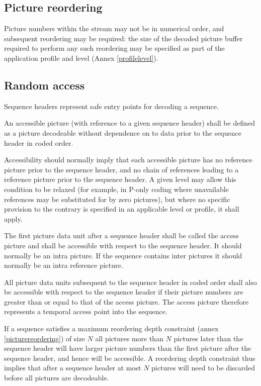 \subsection{Picture reordering}
Picture numbers within the stream may not be in numerical order, and 
subsequent reordering may be required: the size  
of the decoded picture buffer required to perform any such reordering may be 
specified as part of the application profile and level (Annex \ref{profilelevel}).
 
\subsection{Random access}
\label{randomaccess}
Sequence headers represent safe entry points for decoding a sequence. 

An accessible picture (with reference to a given sequence header)
shall be defined as a picture decodeable without dependence on 
to data prior to the sequence header in coded order.

Accessibility should normally imply that each accessible picture has
no reference picture prior to the sequence header, and no chain of 
references leading to a reference picture prior to the sequence header. 
A given level may allow this condition to
be relaxed (for example, in P-only coding where unavailable references
may be substituted for by zero pictures), but where no specific provision
to the contrary is specified in an applicable level or profile, it shall 
apply.

The first picture data unit after a sequence header shall be called the 
access picture and shall be accessible with respect to the sequence header.
It should normally be an intra picture. If the sequence contains inter pictures
it should normally be an intra reference picture.

All picture data units subsequent to the sequence header in coded order 
shall also be accessible with respect to the sequence header
if their picture numbers are greater than 
or equal to that of the access picture. The access picture therefore represents 
a temporal access point into the sequence.

\begin{informative}

If a sequence satisfies a maximum reordering depth constraint 
(annex \ref{picturereordering})
of size $N$ all pictures more than $N$ pictures later than the sequence header will
have larger picture numbers than the first picture after the sequence header, and hence will be accessible. A reordering depth constraint thus implies that after a 
sequence header at most $N$ pictures will need to be discarded before all pictures are decodeable.
\end{informative}
